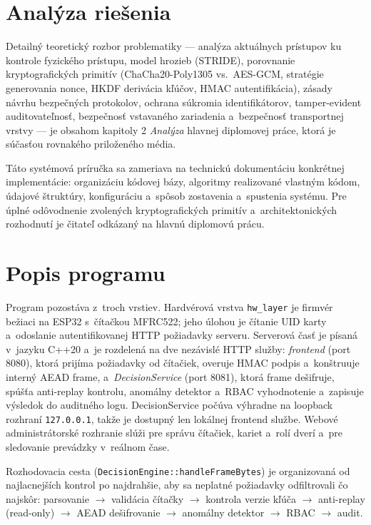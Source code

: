 \documentclass[a4paper]{feidipsp}
\begin{document}
\section{Analýza riešenia}

Detailný teoretický rozbor problematiky --- analýza aktuálnych prístupov ku kontrole fyzického prístupu, model hrozieb (STRIDE\cite{STRIDE}), porovnanie kryptografických primitív (ChaCha20-Poly1305\cite{RFC8439} vs.\ AES-GCM, stratégie generovania nonce, HKDF derivácia kľúčov, HMAC autentifikácia), zásady návrhu bezpečných protokolov, ochrana súkromia identifikátorov, tamper-evident auditovateľnosť, bezpečnosť vstavaného zariadenia a~bezpečnosť transportnej vrstvy --- je obsahom kapitoly 2 \emph{Analýza} hlavnej diplomovej práce, ktorá je súčasťou rovnakého priloženého média.

Táto systémová príručka sa zameriava na technickú dokumentáciu konkrétnej implementácie: organizáciu kódovej bázy, algoritmy realizované vlastným kódom, údajové štruktúry, konfiguráciu a~spôsob zostavenia a~spustenia systému. Pre úplné odôvodnenie zvolených kryptografických primitív a~architektonických rozhodnutí je čitateľ odkázaný na hlavnú diplomovú prácu.

\section{Popis programu}
\label{sec:popis}

Program pozostáva z~troch vrstiev. Hardvérová vrstva \texttt{hw\_layer} je firmvér bežiaci na ESP32 s~čítačkou MFRC522; jeho úlohou je čítanie UID karty a~odoslanie autentifikovanej HTTP požiadavky serveru. Serverová časť je písaná v~jazyku C++20 a~je rozdelená na dve nezávislé HTTP služby: \emph{frontend} (port 8080), ktorá prijíma požiadavky od čítačiek, overuje HMAC podpis a~konštruuje interný AEAD frame, a~\emph{DecisionService} (port 8081), ktorá frame dešifruje, spúšťa anti-replay kontrolu, anomálny detektor a~RBAC vyhodnotenie a~zapisuje výsledok do auditného logu. DecisionService počúva výhradne na loopback rozhraní \texttt{127.0.0.1}, takže je dostupný len lokálnej frontend službe. Webové administrátorské rozhranie slúži pre správu čítačiek, kariet a~rolí dverí a~pre sledovanie prevádzky v~reálnom čase.

Rozhodovacia cesta (\texttt{DecisionEngine::handleFrameBytes}) je organizovaná od najlacnejších kontrol po najdrahšie, aby sa neplatné požiadavky odfiltrovali čo najskôr: parsovanie $\rightarrow$ validácia čítačky $\rightarrow$ kontrola verzie kľúča $\rightarrow$ anti-replay (read-only) $\rightarrow$ AEAD dešifrovanie $\rightarrow$ anomálny detektor $\rightarrow$ RBAC $\rightarrow$ audit.
\end{document}
